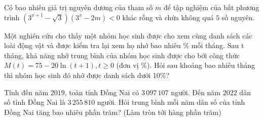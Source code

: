 \begin{ex}%
	Có bao nhiêu giá trị nguyên dương của tham số $m$ để tập nghiệm của bất phương trình $(3^{x+1}-\sqrt{3} )(3^x-2m )<0$ khác rỗng và chứa không quá $5$ số nguyên.
\end{ex}

\begin{ex}%
	Một nghiên cứu cho thấy một nhóm học sinh được cho xem cùng danh sách các loài động vật và được kiểm tra lại xem họ nhớ bao nhiêu \% mỗi tháng. Sau t tháng, khả năng nhớ trung bình của nhóm học sinh được cho bới công thức $M(t)=75-20\ln (t+1 ),t\ge 0$ (đơn vị \%). Hỏi sau khoảng bao nhiêu tháng thì nhóm học sinh đó nhớ được danh sách dưới 10\%?
\end{ex}

\begin{ex}%
	Tính đến năm $2019$, toàn tỉnh Đồng Nai có $3\,097\,107$ người. Đến năm $2022$ dân số tỉnh Đồng Nai là $3\,255\,810$ người. Hỏi trung bình mỗi năm dân số của tỉnh Đồng Nai tăng bao nhiêu phần trăm? (Làm tròn tới hàng phần trăm)
\end{ex}

